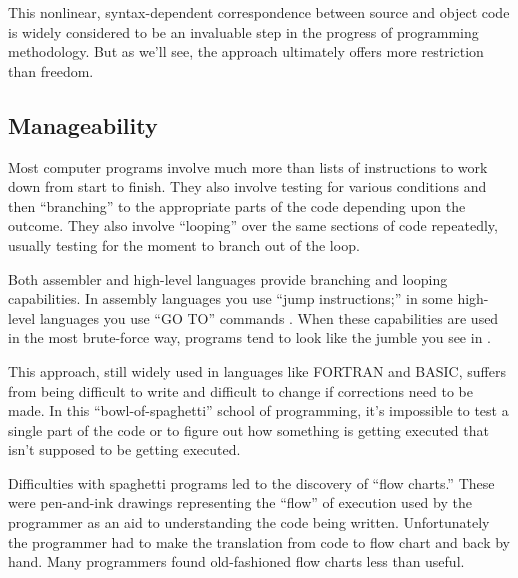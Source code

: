 This nonlinear, syntax-dependent correspondence between source and
object code is widely considered to be an invaluable step in the
progress of programming methodology. But as we'll see, the approach
ultimately offers more restriction than freedom.%
%

\subsection{Manageability}%
%
Most computer programs involve much more than lists of instructions
to work down from start to finish. They also involve testing for various
conditions and then ``branching'' to the appropriate parts of the
code depending upon the outcome. They also involve ``looping''
over the same sections of code repeatedly, usually testing for the
moment to branch out of the loop.

Both assembler and high-level languages
provide branching and looping
capabilities. In assembly languages%
you use ``jump instructions;''%
in some high-level languages%
you use ``GO TO'' commands%
.
When these capabilities are used in the most brute-force way, programs
tend to look like the jumble you see in .


This approach, still widely used in languages like
FORTRAN and BASIC,
suffers from being difficult to write and difficult
to change if corrections need to be made. In this ``bowl-of-spaghetti''
school of programming, it's impossible to test a single part of the
code or to figure out how something is getting executed that isn't
supposed to be getting executed.

Difficulties with spaghetti programs%
led to the discovery of ``flow charts.''%
These were pen-and-ink drawings representing the ``flow'' of execution
used by the programmer as an aid to understanding the code being
written. Unfortunately the programmer had to make the translation from
code to flow chart and back by hand. Many programmers found
old-fashioned flow charts less than useful.%
%


